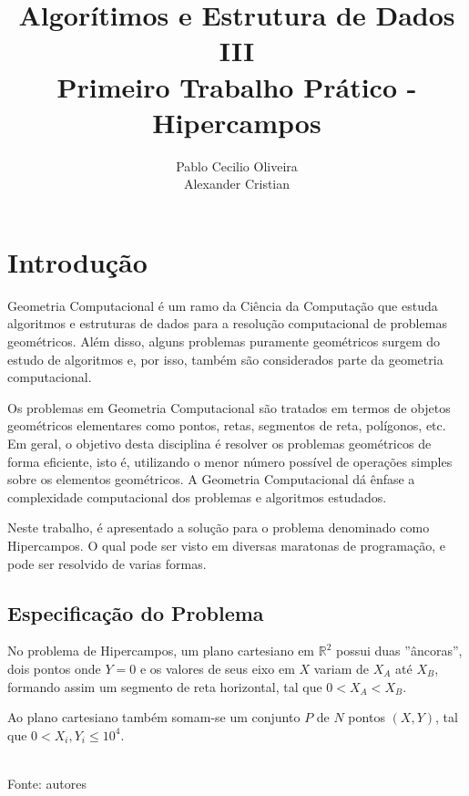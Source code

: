 \documentclass[12pt,a4paper]{article}
\author{Pablo Cecilio Oliveira\\
	Alexander Cristian}
\title{Algorítimos e Estrutura de Dados III\\
	Primeiro Trabalho Prático - Hipercampos}
\date{}
\begin{document}
\maketitle

\section{Introdução}

Geometria Computacional é um ramo da Ciência da Computação que estuda algoritmos e estruturas de dados para a resolução computacional de problemas geométricos. Além disso, alguns problemas puramente geométricos surgem do estudo de algoritmos e, por isso, também são considerados parte da geometria computacional.

Os problemas em Geometria Computacional são tratados em termos de objetos geométricos elementares como pontos, retas, segmentos de reta, polígonos, etc. Em geral, o objetivo desta disciplina é resolver os problemas geométricos de forma eficiente, isto é, utilizando o menor número possível de operações simples sobre os elementos geométricos. A Geometria Computacional dá ênfase a complexidade computacional dos problemas e algoritmos estudados.

Neste trabalho, é apresentado a solução para o problema denominado como Hipercampos. O qual pode ser visto em diversas maratonas de programação, e pode ser resolvido de varias formas.

\subsection{Especificação do Problema}

No problema de Hipercampos, um plano cartesiano em $\mathbb{R}^2$ possui duas ''âncoras'', dois pontos onde $Y=0$ e os valores de seus eixo em $X$ variam de $X_A$ até $X_B$, formando assim um segmento de reta horizontal, tal que $0 < X_A < X_B$.

Ao plano cartesiano também somam-se um conjunto $P$ de $N$ pontos $(X,Y)$, tal que $0 < X_i,Y_i \leqslant 10^4$.

\begin{center}
\footnotesize{\\Fonte: autores}
\end{center}
\end{document}
